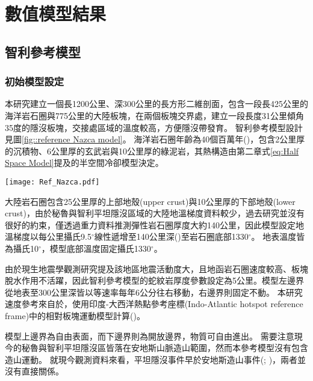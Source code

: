 
\chapter{數值模型結果}

\section{智利參考模型}
\subsection{初始模型設定}
本研究建立一個長1200公里、深300公里的長方形二維剖面，包含一段長425公里的海洋岩石圈與775公里的大陸板塊，在兩個板塊交界處，建立一段長度31公里傾角35度的隱沒板塊，交接處區域的溫度較高，方便隱沒帶發育。
智利參考模型設計見圖\ref{fig::reference Nazca model}。
海洋岩石圈年齡為40個百萬年(\citealp{muller2019})，包含2公里厚的沉積物、6公里厚的玄武岩與10公里厚的綠泥岩，其熱構造由第二章式\ref{eq:Half Space Model}提及的半空間冷卻模型決定。

\begin{figure*}[hb]
    \centering
    \texttt{[image: Ref\_Nazca.pdf]}
    \caption[智利參考模型設計與邊界條件示意圖]{智利參考模型設計與邊界條件示意圖}
    \label{fig::reference Nazca model}
\end{figure*}

大陸岩石圈包含25公里厚的上部地殼(upper crust)與10公里厚的下部地殼(lower crust)，由於秘魯與智利平坦隱沒區域的大陸地溫梯度資料較少，過去研究並沒有很好的約束，僅透過重力資料推測彈性岩石圈厚度大約140公里，因此模型設定地溫梯度以每公里攝氏9.5$^{\circ}$線性遞增至140公里深(\citealp{perez2008})至岩石圈底部1330$^{\circ}$。
地表溫度皆為攝氏10$^{\circ}$，模型底部溫度固定攝氏1330$^{\circ}$。

由於現生地震學觀測研究提及該地區地震活動度大，且地函岩石圈速度較高、板塊脫水作用不活躍，因此智利參考模型的蛇紋岩厚度參數設定為5公里。模型左邊界從地表至300公里深皆以等速率每年6公分往右移動，右邊界則固定不動。
本研究速度參考來自於\citealp{o2005uncertainties}，使用印度-大西洋熱點參考座標(Indo-Atlantic hotspot reference frame)中的相對板塊運動模型計算(\citealp{schellart2008global})。

模型上邊界為自由表面，而下邊界則為開放邊界，物質可自由進出。
需要注意現今的秘魯與智利平坦隱沒區皆落在安地斯山脈造山範圍，然而本參考模型沒有包含造山運動。
就現今觀測資料來看，平坦隱沒事件早於安地斯造山事件(\citealp{chen2019southward}; \citealp{hu2021southward})，兩者並沒有直接關係。


